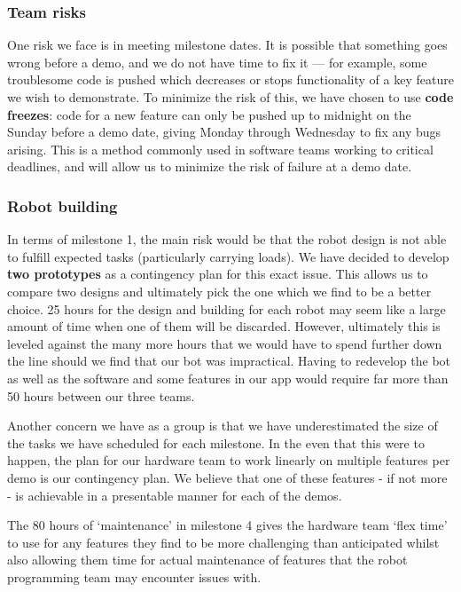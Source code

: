 \documentclass{article}
\begin{document}
\subsubsection{Team risks}

One risk we face is in meeting milestone dates. It is possible that something goes wrong before a demo, and we do not have time to fix it --- for example, some troublesome code is pushed which decreases or stops functionality of a key feature we wish to demonstrate. To minimize the risk of this, we have chosen to use {\bf code freezes}: code for a new feature can only be pushed up to midnight on the Sunday before a demo date, giving Monday through Wednesday to fix any bugs arising. This is a method commonly used in software teams working to critical deadlines, and will allow us to minimize the risk of failure at a demo date.


\subsubsection{Robot building}

In terms of milestone 1, the main risk would be that the robot design is not able to fulfill expected tasks (particularly carrying loads). We have decided to develop {\bf two prototypes} as a contingency plan for this exact issue. This allows us to compare two designs and ultimately pick the one which we find to be a better choice. 25 hours for the design and building for each robot may seem like a large amount of time when one of them will be discarded. However, ultimately this is leveled against the many more hours that we would have to spend further down the line should we find that our bot was impractical. Having to redevelop the bot as well as the software and some features in our app would require far more than 50 hours between our three teams.

Another concern we have as a group is that we have underestimated the size of the tasks we have scheduled for each milestone. In the even that this were to happen, the plan for our hardware team to work linearly on multiple features per demo is our contingency plan. We believe that one of these features - if not more - is achievable in a presentable manner for each of the demos.

The 80 hours of `maintenance' in milestone 4 gives the hardware team `flex time' to use for any features they find to be more challenging than anticipated whilst also allowing them time for actual maintenance of features that the robot programming team may encounter issues with.
\end{document}
